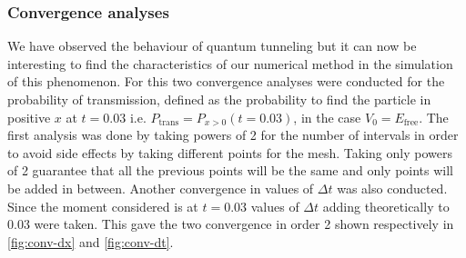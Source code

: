 \subsubsection{Convergence analyses}
We have observed the behaviour of quantum tunneling but it can now be interesting to find the characteristics of our numerical method in the simulation of this phenomenon. For this two convergence analyses were conducted for the probability of transmission, defined as the probability to find the particle in positive $x$ at $t=0.03$ i.e. $P_\mathrm{trans} = P_{x>0}(t=0.03)$, in the case $V_0 = E_\mathrm{free}$. The first analysis was done by taking powers of 2 for the number of intervals in order to avoid side effects by taking different points for the mesh. Taking only powers of 2 guarantee that all the previous points will be the same and only points will be added in between. Another convergence in values of $\Delta t$ was also conducted. Since the moment considered is at $t=0.03$ values of $\Delta t$ adding theoretically to 0.03 were taken. This gave the two convergence in order 2 shown respectively in \autoref{fig:conv-dx} and \autoref{fig:conv-dt}.
